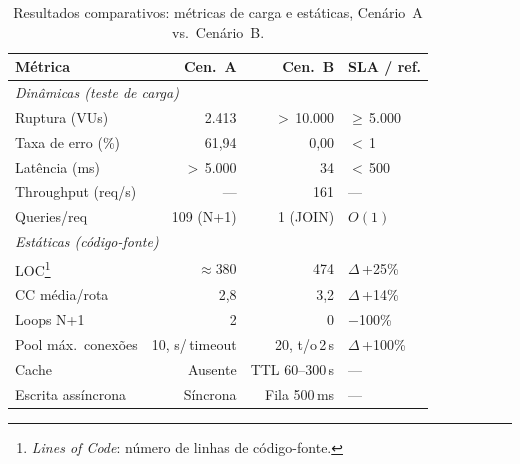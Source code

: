 \documentclass[sigconf]{acmart}
\begin{document}
\begin{table}[h]
  \caption{Resultados comparativos: métricas de carga e estáticas, Cenário~A vs.\ Cenário~B.}
  \label{tab:resultados}
  \begin{tabular}{lrrl}
    \toprule
    \textbf{Métrica} & \textbf{Cen.~A} & \textbf{Cen.~B} & \textbf{SLA / ref.} \\
    \midrule
    \multicolumn{4}{l}{\textit{Dinâmicas (teste de carga)}} \\
    Ruptura (VUs)      & 2.413        & $>$\,10.000      & $\geq$\,5.000 \\
    Taxa de erro (\%)  & 61,94        & 0,00             & $<$\,1        \\
    Latência (ms)      & $>$\,5.000   & 34               & $<$\,500      \\
    Throughput (req/s) & ---          & 161              & ---           \\
    Queries/req        & 109 (N+1)    & 1 (JOIN)         & $O(1)$        \\
    \midrule
    \multicolumn{4}{l}{\textit{Estáticas (código-fonte)}} \\
    LOC\footnote{\textit{Lines of Code}: número de linhas de código-fonte.}
                       & $\approx$380 & 474              & $\Delta$\,+25\% \\
    CC média/rota      & 2,8          & 3,2              & $\Delta$\,+14\% \\
    Loops N+1          & 2            & 0                & $-$100\%      \\
    Pool máx.\ conexões & 10, s/\,timeout & 20, t/o\,2\,s & $\Delta$\,+100\% \\
    Cache              & Ausente      & TTL 60--300\,s   & ---           \\
    Escrita assíncrona & Síncrona     & Fila 500\,ms     & ---           \\
    \bottomrule
  \end{tabular}
\end{table}
\end{document}
